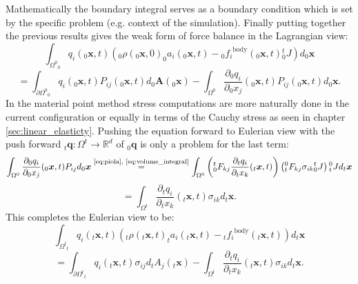 \documentclass[m,times]{cgMA}
\begin{document}
Mathematically the boundary integral serves as a boundary condition which is set by the specific problem (e.g. context of the simulation). Finally putting together the previous results gives the weak form of force balance in the Lagrangian view:
$$
\int _ { \Omega ^ { 0 } } _0q _ { i } ( _0\boldsymbol { x } , t ) \left(_0\rho (_0\boldsymbol{x} , 0 ) _0a _{ i } (_0\boldsymbol{x} , t ) - {_0f_i} ^ {\text{body}}(_0\boldsymbol{x},t) {^t_0J}\right) d _0\boldsymbol{x}
$$
\begin{equation} \label{eq:lagr_force_bal}
  = \int _ { \partial \Omega ^ { 0 } } _0q _ { i } ( _0\boldsymbol { x } , t ) P _ {ij} ( _0\boldsymbol{x} , t)
  d_0\boldsymbol{A}(_0\boldsymbol{x})
  -\int _ { \Omega ^ { 0 } }  \frac{\partial _0q _ { i }}{\partial _0x_j} ( _0\boldsymbol { x } , t ) P _ {ij}( _0\boldsymbol{x} , t )
  d_0\boldsymbol{x}.
\end{equation}
In the material point method stress computations are more naturally done in the current configuration or equally in terms of the Cauchy stress as seen in chapter \ref{sec:linear_elasticty}. Pushing the equation forward to Eulerian view with the push forward $_t\boldsymbol{q}:\Omega^t \rightarrow \mathbb{R}^d$ of $_0\boldsymbol{q}$ is only a problem for the last term:
$$
\int _ { \Omega ^ { 0 } }  \frac{\partial _0q _ { i }}{\partial _0x_j} ( _0\boldsymbol { x } , t ) P _ {ij} d_0\boldsymbol{x}
\stackrel{\text{\ref{eq:piola}, \ref{eq:volume_integral}}}{=}
\int _ { \Omega ^ { 0 } }  \left({^t_0}F_{kj}\frac{\partial _tq _ { i }}{\partial _tx_k} ( _t\boldsymbol { x } , t )\right) \left({_t^0}F_{kj} \sigma _ {ik} {_0^tJ}\right) {_t^0J} d_t\boldsymbol{x}
$$
\begin{equation}  =  \int _ { \Omega ^ { t } } \frac{\partial _tq _ { i }}{\partial _tx_k} ( _t\boldsymbol { x } , t )\sigma _ {ik} d_t\boldsymbol{x}.
\end{equation}
This completes the Eulerian view to be:
$$
\int _ { \Omega ^ { t } } _tq _ { i } ( _t\boldsymbol { x } , t ) \left(_t\rho (_t\boldsymbol{x} , t) _ta _{ i } (_t\boldsymbol{x} , t ) - {_tf_i} ^ {\text{body}}(_t\boldsymbol{x},t)\right) d _t\boldsymbol{x}
$$
\begin{equation}\label{eq:eul_force_bal}
  = \int _ { \partial \Omega ^ { t } } _tq _ { i } ( _t\boldsymbol { x } , t ) \sigma _ {ij} d_tA_j(_t\boldsymbol{x}) -  \int _ { \Omega ^ { t } } \frac{\partial _tq _ { i }}{\partial _tx_k} ( _t\boldsymbol { x } , t )\sigma _ {ik} d_t\boldsymbol{x}.
\end{equation}
\begin{flushright}\cite{MPM:COURSE}\cite{strang2007computational}\cite{bathe2006finite}\end{flushright}
\end{document}
